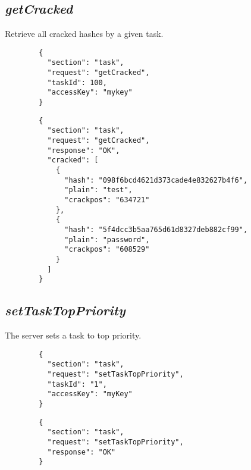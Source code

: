 \subsection*{\textit{getCracked}}
	Retrieve all cracked hashes by a given task.
	{
		\color{blue}
		\begin{verbatim}
		{
		  "section": "task",
		  "request": "getCracked",
		  "taskId": 100,
		  "accessKey": "mykey"
		}
		\end{verbatim}
	}
	{
		\color{OliveGreen}
		\begin{verbatim}
		{
		  "section": "task",
		  "request": "getCracked",
		  "response": "OK",
		  "cracked": [
		    {
		      "hash": "098f6bcd4621d373cade4e832627b4f6",
		      "plain": "test",
		      "crackpos": "634721"
		    },
		    {
		      "hash": "5f4dcc3b5aa765d61d8327deb882cf99",
		      "plain": "password",
		      "crackpos": "608529"
		    }
		  ]
		}
		\end{verbatim}
	}

\subsection*{\textit{setTaskTopPriority}}
	The server sets a task to top priority.
	{
		\color{blue}
		\begin{verbatim}
		{
		  "section": "task",
		  "request": "setTaskTopPriority",
		  "taskId": "1",
		  "accessKey": "myKey"
		}
		\end{verbatim}
	}
	{
		\color{OliveGreen}
		\begin{verbatim}
		{
		  "section": "task",
		  "request": "setTaskTopPriority",
		  "response": "OK"
		}
		\end{verbatim}
	}














